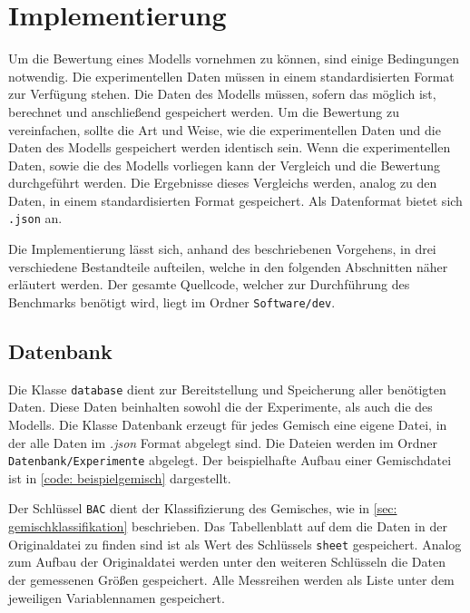 \documentclass[../thesis.tex]{subfiles}
\begin{document}
\chapter{Implementierung}
\label{chp: implementierung}

Um die Bewertung eines Modells vornehmen zu können, sind einige Bedingungen notwendig. Die experimentellen Daten müssen in einem standardisierten Format zur Verfügung stehen. Die Daten des Modells müssen, sofern das möglich ist, berechnet und anschließend gespeichert werden. Um die Bewertung zu vereinfachen, sollte die Art und Weise, wie die experimentellen Daten und die Daten des Modells gespeichert werden identisch sein. Wenn die experimentellen Daten, sowie die des Modells vorliegen kann der Vergleich und die Bewertung durchgeführt werden. Die Ergebnisse dieses Vergleichs werden, analog zu den Daten, in einem standardisierten Format gespeichert. Als Datenformat bietet sich \texttt{.json} an.

Die Implementierung lässt sich, anhand des beschriebenen Vorgehens, in drei verschiedene Bestandteile aufteilen, welche in den folgenden Abschnitten näher erläutert werden. Der gesamte Quellcode, welcher zur Durchführung des Benchmarks benötigt wird, liegt im Ordner \texttt{Software/dev}.

\section{Datenbank}

Die Klasse \texttt{database} dient zur Bereitstellung und Speicherung aller benötigten Daten. Diese Daten beinhalten sowohl die der Experimente, als auch die des Modells. Die Klasse Datenbank erzeugt für jedes Gemisch eine eigene Datei, in der alle Daten im \textit{.json} Format abgelegt sind. Die Dateien werden im Ordner \texttt{Datenbank/Experimente} abgelegt. Der beispielhafte Aufbau einer Gemischdatei ist in \autoref{code: beispielgemisch} dargestellt.


\label{code: beispielgemisch}

Der Schlüssel \texttt{BAC} dient der Klassifizierung des Gemisches, wie in \autoref{sec: gemischklassifikation} beschrieben. Das Tabellenblatt auf dem die Daten in der Originaldatei zu finden sind ist als Wert des Schlüssels \texttt{sheet} gespeichert. Analog zum Aufbau der Originaldatei werden unter den weiteren Schlüsseln die Daten der gemessenen Größen gespeichert. Alle Messreihen werden als Liste unter dem jeweiligen Variablennamen gespeichert.
\end{document}
